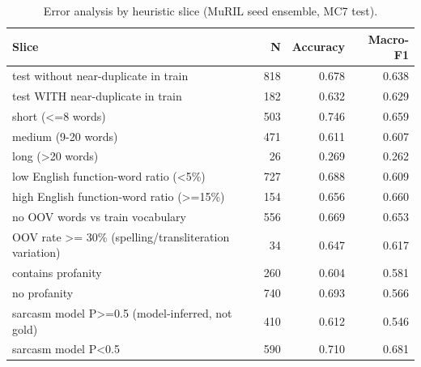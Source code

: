 \begin{table}[t]
\centering
\small
\caption{Error analysis by heuristic slice (MuRIL seed ensemble, MC7 test).}
\label{tab:tab11_error_slices}
\begin{tabular}{lrrr}
\toprule
Slice & N & Accuracy & Macro-F1 \\
\midrule
test without near-duplicate in train & 818 & 0.678 & 0.638 \\
test WITH near-duplicate in train & 182 & 0.632 & 0.629 \\
short (<=8 words) & 503 & 0.746 & 0.659 \\
medium (9-20 words) & 471 & 0.611 & 0.607 \\
long (>20 words) & 26 & 0.269 & 0.262 \\
low English function-word ratio (<5\%) & 727 & 0.688 & 0.609 \\
high English function-word ratio (>=15\%) & 154 & 0.656 & 0.660 \\
no OOV words vs train vocabulary & 556 & 0.669 & 0.653 \\
OOV rate >= 30\% (spelling/transliteration variation) & 34 & 0.647 & 0.617 \\
contains profanity & 260 & 0.604 & 0.581 \\
no profanity & 740 & 0.693 & 0.566 \\
sarcasm model P>=0.5 (model-inferred, not gold) & 410 & 0.612 & 0.546 \\
sarcasm model P<0.5 & 590 & 0.710 & 0.681 \\
\bottomrule
\end{tabular}
\end{table}
